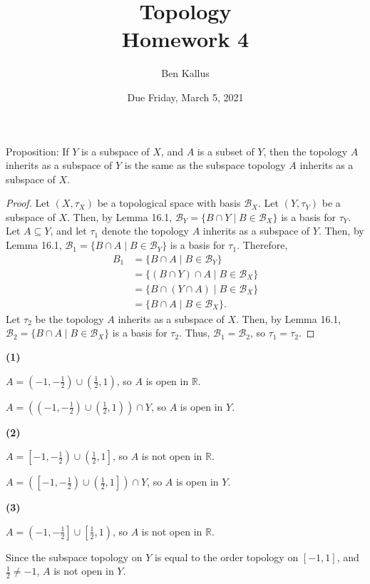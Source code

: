 \documentclass{article}
\date{Due Friday, March 5, 2021}
\author{Ben Kallus}
\title{Topology \\ Homework 4}
\newcommand{\R}{\mathbb R}
\newcommand{\B}{\mathcal B}
\begin{document}
\pagecolor{black}
\color{white}
\maketitle

 Proposition: If $Y$ is a subspace of $X$, and $A$ is a subset of $Y$, then the topology $A$ inherits as a subspace of $Y$ is the same as the subspace topology $A$ inherits as a subspace of $X$.
\begin{proof}
    Let $(X, \tau_X)$ be a topological space with basis $\B_X$.
    Let $(Y, \tau_Y)$ be a subspace of $X$.
    Then, by Lemma 16.1, $\B_Y = \{B \cap Y \mid B \in \B_X\}$ is a basis for $\tau_Y$.
    Let $A \subseteq Y$, and let $\tau_1$ denote the topology $A$ inherits as a subspace of $Y$.
    Then, by Lemma 16.1, $\B_1 = \{B \cap A \mid B \in \B_Y\}$ is a basis for $\tau_1$.
    Therefore,
    \begin{align*}
        B_1 &= \{B \cap A \mid B \in \B_Y\} \\
            &= \{(B \cap Y) \cap A \mid B \in \B_X\} \\
            &= \{B \cap (Y \cap A) \mid B \in \B_X\} \\
            &= \{B \cap A \mid B \in \B_X\}.
    \end{align*}
    Let $\tau_2$ be the topology $A$ inherits as a subspace of $X$.
    Then, by Lemma 16.1, $\B_2 = \{B \cap A \mid B \in \B_X\}$ is a basis for $\tau_2$.
    Thus, $\B_1 = \B_2$, so $\tau_1 = \tau_2$.
\end{proof}

\newpage
{}

{\bf (1)}

    $A = \left(-1, -\frac12\right) \cup \left(\frac12, 1\right)$, so $A$ is open in $\R$.

    $A = \left(\left(-1, -\frac12\right) \cup \left(\frac12, 1\right)\right) \cap Y$, so $A$ is open in $Y$.

\medskip
{\bf (2)}

    $A = \left[-1, -\frac12\right) \cup \left(\frac12, 1\right]$, so $A$ is not open in $\R$.

    $A = \left(\left[-1, -\frac12\right) \cup \left(\frac12, 1\right]\right) \cap Y$, so $A$ is open in $Y$.

\medskip
{\bf (3)}

    $A = \left(-1, -\frac12\right] \cup \left[\frac12, 1\right)$, so $A$ is not open in $\R$.

    Since the subspace topology on $Y$ is equal to the order topology on $[-1,1]$, and $\frac12 \neq -1$, $A$ is not open in $Y$.
\end{document}
